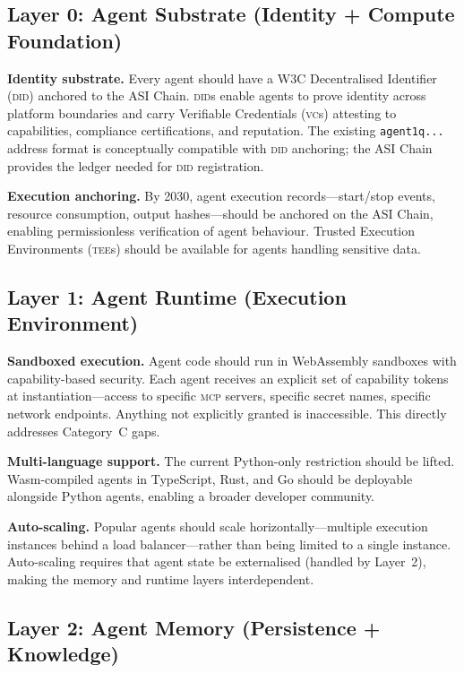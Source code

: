\documentclass[twoside,11pt]{article}
\begin{document}
\subsection{Layer 0: Agent Substrate (Identity + Compute Foundation)}
\label{subsec:layer0}

\textbf{Identity substrate.} Every agent should have a W3C Decentralised
Identifier (\textsc{did}) \citep{garzon2025agentdid,w3c2022did} anchored to
the ASI Chain.  \textsc{did}s enable agents to prove identity across platform
boundaries and carry Verifiable Credentials (\textsc{vc}s) attesting to
capabilities, compliance certifications, and reputation.  The existing
\texttt{agent1q...} address format is conceptually compatible with \textsc{did}
anchoring; the ASI Chain provides the ledger needed for \textsc{did}
registration.

\textbf{Execution anchoring.} By 2030, agent execution records---start/stop
events, resource consumption, output hashes---should be anchored on the ASI
Chain, enabling permissionless verification of agent behaviour.  Trusted
Execution Environments (\textsc{tee}s) should be available for agents handling
sensitive data.

\subsection{Layer 1: Agent Runtime (Execution Environment)}
\label{subsec:layer1}

\textbf{Sandboxed execution.} Agent code should run in WebAssembly sandboxes
with capability-based security.  Each agent receives an explicit set of
capability tokens at instantiation---access to specific \textsc{mcp} servers,
specific secret names, specific network endpoints.  Anything not explicitly
granted is inaccessible.  This directly addresses Category~C gaps.

\textbf{Multi-language support.} The current Python-only restriction should be
lifted.  Wasm-compiled agents in TypeScript, Rust, and Go should be deployable
alongside Python agents, enabling a broader developer community.

\textbf{Auto-scaling.} Popular agents should scale horizontally---multiple
execution instances behind a load balancer---rather than being limited to a
single instance.  Auto-scaling requires that agent state be externalised
(handled by Layer~2), making the memory and runtime layers interdependent.

\subsection{Layer 2: Agent Memory (Persistence + Knowledge)}
\label{subsec:layer2}
\end{document}

